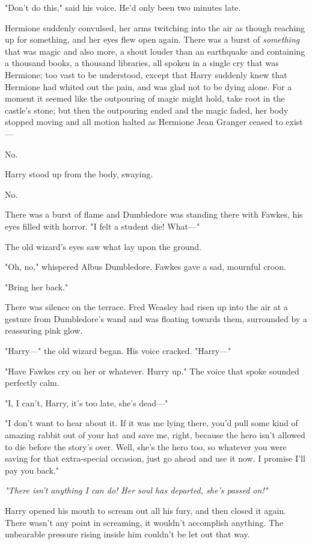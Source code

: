 "Don't do this," said his voice. He'd only been two minutes late.

Hermione suddenly convulsed, her arms twitching into the air as though reaching
up for something, and her eyes flew open again. There was a burst of
\emph{something} that was magic and also more, a shout louder than an
earthquake and containing a thousand books, a thousand libraries, all spoken in
a single cry that was Hermione; too vast to be understood, except that Harry
suddenly knew that Hermione had whited out the pain, and was glad not to be
dying alone. For a moment it seemed like the outpouring of magic might hold,
take root in the castle's stone; but then the outpouring ended and the magic
faded, her body stopped moving and all motion halted as Hermione Jean Granger
ceased to exist\mbox{---}

No.

Harry stood up from the body, swaying.

No.

There was a burst of flame and Dumbledore was standing there with Fawkes, his
eyes filled with horror. "I felt a student die! What\mbox{---}"

The old wizard's eyes saw what lay upon the ground.

"Oh, no," whispered Albus Dumbledore. Fawkes gave a sad, mournful croon.

"Bring her back."

There was silence on the terrace. Fred Weasley had risen up into the air at a
gesture from Dumbledore's wand and was floating towards them, surrounded by a
reassuring pink glow.

"Harry\mbox{---}" the old wizard began. His voice cracked. "Harry\mbox{---}"

"Have Fawkes cry on her or whatever. Hurry up." The voice that spoke sounded
perfectly calm.

"I, I can't, Harry, it's too late, she's dead\mbox{---}"

"I don't want to hear about it. If it was me lying there, you'd pull some kind
of amazing rabbit out of your hat and save me, right, because the hero isn't
allowed to die before the story's over. Well, she's the hero too, so whatever
you were saving for that extra-special occasion, just go ahead and use it now.
I promise I'll pay you back."

\emph{"There isn't anything I can do! Her soul has departed, she's passed on!"}

Harry opened his mouth to scream out all his fury, and then closed it again.
There wasn't any point in screaming, it wouldn't accomplish anything. The
unbearable pressure rising inside him couldn't be let out that way.

